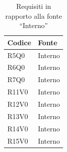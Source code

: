	\begin{table}[H]
		{\def\arraystretch{1.5}
		\begin{tabularx}{\textwidth}{XX}
			\rowcolor{beautyblue}
			\textbf{Codice} &
			\textbf{Fonte} \\ \hline
			R5Q0 & Interno \\
			R6Q0 & Interno \\
			R7Q0 & Interno \\
			R11V0 & Interno \\
			R12V0 & Interno \\
			R13V0 & Interno \\
			R14V0 & Interno \\
			R15V0 & Interno \\
		\end{tabularx}} \\
	\caption{Requisiti in rapporto alla fonte ``Interno''}
	\end{table}






